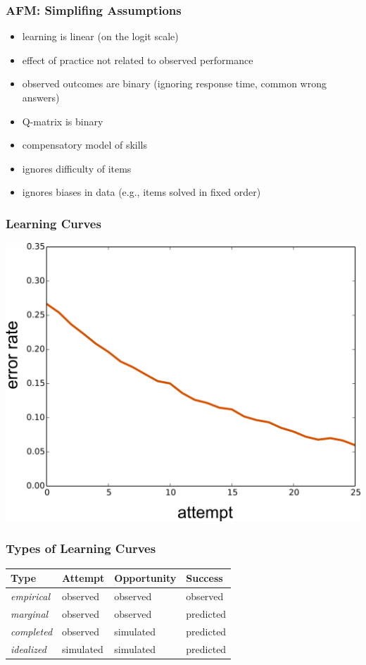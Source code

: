 \documentclass[bigger]{beamer}
\begin{document}
\begin{frame}
  \frametitle{AFM: Simplifing Assumptions}

  \begin{itemize}
  \item learning is linear (on the logit scale)
  \item effect of practice not related to observed performance
  \item observed outcomes are binary (ignoring response time, common wrong
    answers)
  \item Q-matrix is binary
  \item compensatory model of skills
  \item ignores difficulty of items
  \item ignores biases in data (e.g., items solved in fixed order)
  \end{itemize}
\end{frame}

\begin{frame}
  \frametitle{Learning Curves}

  \begin{center}
    \includegraphics[width=.8\linewidth]{learn-curve-simple}
  \end{center}
\end{frame}

\begin{frame}
  \frametitle{Types of Learning Curves}

  \begin{center}
  \begin{tabular}{llll}
    \toprule
    Type & Attempt & Opportunity & Success\\
    \midrule
    {\it empirical} & observed  & observed  & observed\\
    {\it marginal}  & observed  & observed  & predicted\\
    {\it completed} & observed  & simulated & predicted\\
    {\it idealized} & simulated & simulated & predicted\\
    \bottomrule
  \end{tabular}    
  \end{center}
\end{frame}
\end{document}

